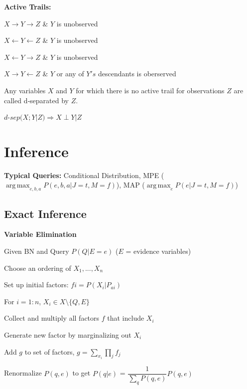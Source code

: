 \documentclass[a4paper, 11pt, landscape]{article}
\DeclareMathOperator*{\argmax}{arg\,max}
\begin{document}
\begin{multicols*}{3}
		\textbf{Active Trails:}
		\begin{compactitem}
			\item  $X \rightarrow  Y \rightarrow Z$ \& $Y$ is unobserved
			\item  $X \leftarrow  Y \leftarrow Z$ \& $Y$ is unobserved
			\item  $X \leftarrow  Y \rightarrow Z$ \& $Y$ is unobserved
			\item  $X \rightarrow  Y \leftarrow Z$ \& $Y$ or any of $Y's$ descendants is oberserved
		\end{compactitem}
	
		Any variables $X$ and $Y$ for which there is no active trail for observations $Z$ are called d‐separated by $Z$. 
		
		$d$-$sep(X;Y | Z) \Rightarrow X \perp Y | Z$
		
		\section{Inference}
		\textbf{Typical Queries:} Conditional Distribution, MPE ($\argmax_{e,b,a} P(e,b,a | J=t, M = f)$), MAP ($\argmax_{e} P(e | J=t, M = f)$)
		
		\subsection{Exact Inference}
		
		\textbf{Variable Elimination}
		
		\begin{compactitem}
			
		\item Given BN and Query $P(Q | E=e)$ ($E$ = evidence variables)
		\item Choose an ordering of $X_1, ..., X_n$
		\item Set up initial factors: $fi = P(X_i | P_{ai})$
		\item For $i =1:n$, $X_i  \in X\setminus \{Q,E\}$
		\begin{compactenum}
			\item Collect and multiply all factors $f$ that include $X_i$  
			\item Generate new factor by marginalizing out $X_i$
			\item Add $g$ to set of factors, $g = \sum_{x_i}\prod_{j}f_j$
		\end{compactenum}
		\item  Renormalize $P(q,e)$ to get $P(q | e)$ = $\dfrac{1}{\sum_{q}P(q,e)}P(q,e)$
		

\end{compactitem}
\end{multicols*}
\end{document}
